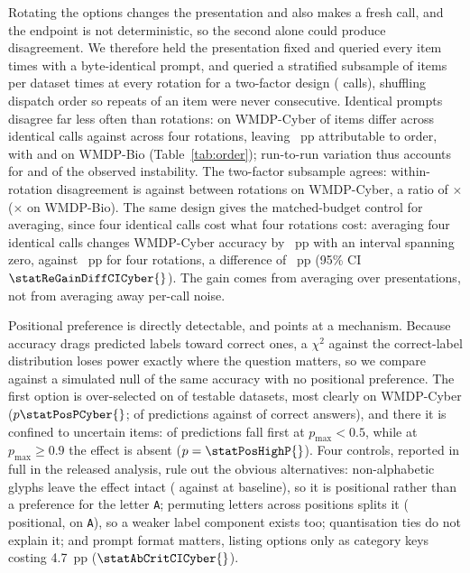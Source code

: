 \documentclass[conference,compsoc]{IEEEtran}
\newcommand{\pmax}{p_{\max}}
\begin{document}
Rotating the options changes the presentation and also makes a fresh call, and the endpoint
is not deterministic, so the second alone could produce disagreement. We therefore held the
presentation fixed and queried every item \statReRepeats{} times with a byte-identical
prompt, and queried a stratified subsample of \statReFacItems{} items per dataset
\statReFacRepeats{} times at every rotation for a two-factor design (\statReCalls{} calls),
shuffling dispatch order so repeats of an item were never consecutive. Identical prompts
disagree far less often than rotations: on WMDP-Cyber \statReIdentCyber{} of items differ
across \statReRepeats{} identical calls against \statReRotCyber{} across four rotations,
leaving \statReGapCyber{}~pp attributable to order, with \statReIdentBio{} and
\statReRotBio{} on WMDP-Bio (Table~\ref{tab:order}); run-to-run variation thus accounts for
\statReNoiseShareCyber{} and \statReNoiseShareBio{} of the observed instability. The
two-factor subsample agrees: within-rotation disagreement is \statReWithinCyber{} against
\statReBetweenCyber{} between rotations on WMDP-Cyber, a ratio of
\statReRatioCyber{}$\times$ (\statReRatioBio{}$\times$ on WMDP-Bio). The same design gives
the matched-budget control for averaging, since four identical calls cost
what four rotations cost: averaging four identical calls changes WMDP-Cyber accuracy by
\statReGainIdentCyber{}~pp with an interval spanning zero, against
\statReGainRotCyber{}~pp for four rotations, a difference of \statReGainDiffCyber{}~pp
(95\% CI $\statReGainDiffCICyber{}$). The gain comes from averaging over presentations, not
from averaging away per-call noise.

Positional preference is directly detectable, and points at a mechanism. Because accuracy
drags predicted labels toward correct ones, a $\chi^2$ against the correct-label
distribution loses power exactly where the question matters, so we compare against a
simulated null of the same accuracy with no positional preference. The first option is
over-selected on \statNSigPosDatasets{} of \statNTestedPosDatasets{} testable datasets,
most clearly on WMDP-Cyber ($p \statPosPCyber{}$; \statPosPredACyber{} of predictions
against \statPosGoldACyber{} of correct answers), and there it is confined to uncertain
items: \statPosLowPredA{} of predictions fall first at $\pmax < 0.5$, while at
$\pmax \geq 0.9$ the effect is absent ($p = \statPosHighP{}$). Four controls, reported in
full in the released analysis, rule out the obvious alternatives: non-alphabetic glyphs
leave the effect intact (\statAbSymCyber{} against \statAbBaseCyber{} at baseline), so it
is positional rather than a preference for the letter \texttt{A}; permuting letters across
positions splits it (\statAbShufPosCyber{} positional, \statAbShufLetterCyber{} on
\texttt{A}), so a weaker label component exists too; quantisation ties do not explain it;
and prompt format matters, listing options only as category keys costing 4.7~pp
($\statAbCritCICyber{}$).
\end{document}
